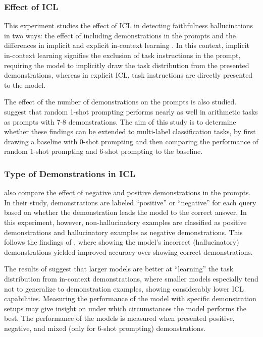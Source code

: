 \documentclass[english, 12pt, a4paper, sci, utf8, a-2b, online]{latex/definitions/aaltothesis}
\begin{document}
\subsubsection*{Effect of ICL}

This experiment studies the effect of ICL in detecting faithfulness hallucinations in two ways: the effect of including demonstrations in the prompts and the differences in implicit and explicit in-context learning \cite{alazraki-etal-2025-need}. In this context, implicit in-context learning signifies the exclusion of task instructions in the prompt, requiring the model to implicitly draw the task distribution from the presented demonstrations, whereas in explicit ICL, task instructions are directly presented to the model.
    
The effect of the number of demonstrations on the prompts is also studied. \textcite{chen-etal-2023-many} suggest that random 1-shot prompting performs nearly as well in arithmetic tasks as prompts with 7-8 demonstrations. The aim of this study is to determine whether these findings can be extended to multi-label classification tasks, by first drawing a baseline with 0-shot prompting and then comparing the performance of random 1-shot prompting and 6-shot prompting to the baseline.

\subsubsection*{Type of Demonstrations in ICL}

\textcite{chen-etal-2023-many} also compare the effect of negative and positive demonstrations in the prompts. In their study, demonstrations are labeled ``positive'' or ``negative'' for each query based on whether the demonstration leads the model to the correct answer. In this experiment, however, non-hallucinatory examples are classified as positive demonstrations and hallucinatory examples as negative demonstrations. This follows the findings of \textcite{alazraki-etal-2025-need}, where showing the model's incorrect (hallucinatory) demonstrations yielded improved accuracy over showing correct demonstrations.
    
The results of \textcite{wei2023largerlanguagemodelsincontext} suggest that larger models are better at ``learning'' the task distribution from in-context demonstrations, where smaller models especially tend not to generalize to demonstration examples, showing considerably lower ICL capabilities. Measuring the performance of the model with specific demonstration setups may give insight on under which circumstances the model performs the best. The performance of the models is measured when presented positive, negative, and mixed (only for 6-shot prompting) demonstrations.
\end{document}
